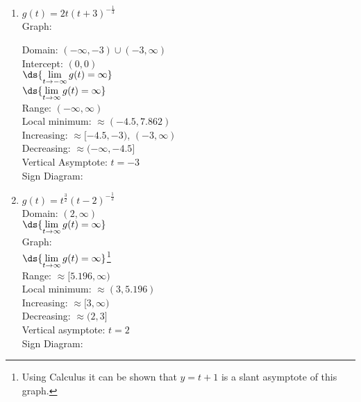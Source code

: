 \documentclass{ximera}
\begin{document}
\begin{enumerate}
\setcounter{enumi}{\value{HW}}

\item \begin{multicols}{2} 
 $g(t) = 2t(t+3)^{-\frac{1}{3}}$ \\
Graph: \\




\vfill
\columnbreak

Domain: $(-\infty, -3) \cup (-3, \infty)$\\
Intercept: $(0,0)$\\
$\ds{\lim_{t \rightarrow -\infty} g(t) = \infty}$\\
$\ds{\lim_{t \rightarrow \infty} g(t) = \infty}$\\
Range: $(-\infty, \infty)$\\
Local minimum: $\approx (-4.5, 7.862)$\\
Increasing: $\approx [-4.5, -3)$, $(-3,\infty)$ \\
Decreasing: $\approx (-\infty, -4.5]$\\
Vertical Asymptote:  $t = -3$\\
Sign Diagram:\\

\smallskip






\end{multicols}

\item \begin{multicols}{2} 
$g(t)= t^{\frac{3}{2}}(t-2)^{-\frac{1}{2}}$\\
Domain:  $(2, \infty)$\\
$\ds{\lim_{t \rightarrow \infty} g(t) = \infty}$\\
Graph: \\




\vfill
\columnbreak
$\ds{\lim_{t \rightarrow \infty} g(t) = \infty}$\footnote{Using Calculus it can be shown that $y = t+1$ is a slant asymptote of this graph.}\\
Range:  $\approx [5.196, \infty)$\\
Local minimum:  $\approx (3, 5.196)$\\
Increasing: $\approx [3, \infty)$\\
Decreasing: $\approx (2,3]$\\
Vertical asymptote:  $t = 2$\\
Sign Diagram:\\

\smallskip





\end{multicols}

\setcounter{HW}{\value{enumi}}
\end{enumerate}
\end{document}
